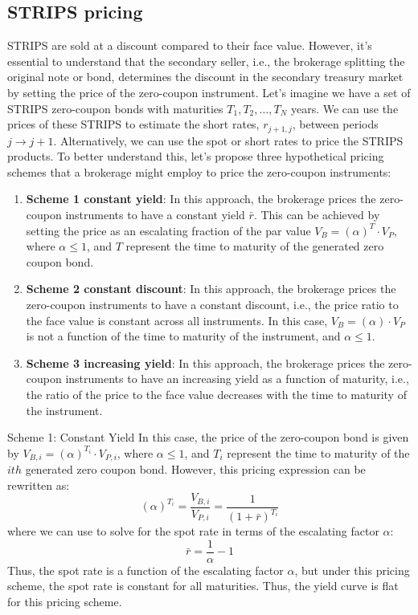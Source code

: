\documentclass[11pt]{article}
\makeatletter
\theoremstyle{definition}
\renewcommand\subsubsection{\@startsection
	{subsubsection}{2}{0mm}
	{-0.05in}
	{-0.5\baselineskip}
	{\normalfont\normalsize\itshape\bfseries}}
\makeatother
\begin{document}
\subsection{STRIPS pricing}
STRIPS are sold at a discount compared to their face value. However, it's essential to understand that the secondary seller, i.e., the brokerage splitting the original note or bond, determines the discount in the secondary treasury market by setting the price of the zero-coupon instrument. Let's imagine we have a set of STRIPS zero-coupon bonds with maturities $T_{1}, T_{2},\ldots, T_{N}$ years. 
We can use the prices of these STRIPS to estimate the short rates, $r_{j+1,j}$, between periods $j\rightarrow{j+1}$.
Alternatively, we can use the spot or short rates to price the STRIPS products. 
To better understand this, let's propose three hypothetical pricing schemes that a brokerage might employ to price the zero-coupon instruments:
\begin{enumerate}
\item{\textbf{Scheme 1 constant yield}: In this approach, the brokerage prices the zero-coupon instruments to have a constant yield $\bar{r}$. This can be achieved by setting the price as an escalating fraction of the par value $V_{B} = \left(\alpha\right)^{T}\cdot{V}_{P}$, where $\alpha\leq{1}$, and $T$ represent the time to maturity of the generated zero coupon bond.}
\item{\textbf{Scheme 2 constant discount}: In this approach, the brokerage prices the zero-coupon instruments to have a constant discount, i.e., the price ratio to the face value is constant across all instruments. In this case, $V_{B} = \left(\alpha\right)\cdot{V}_{P}$ is not a function of the time to maturity of the instrument, and $\alpha\leq{1}$.}
\item{\textbf{Scheme 3 increasing yield}: In this approach, the brokerage prices the zero-coupon instruments to have an increasing yield as a function of maturity, i.e., the ratio of the price to the face value decreases with the time to maturity of the instrument.}
\end{enumerate}

\subsubsection{Scheme 1: Constant Yield}
In this case, the price of the zero-coupon bond is given by $V_{B, i} = \left(\alpha\right)^{T_{i}}\cdot{V}_{P, i}$, where $\alpha\leq{1}$, and $T_{i}$ represent the time to maturity of the $ith$ generated zero coupon bond. However, this pricing expression can be rewritten as:
\begin{equation}
\left(\alpha\right)^{T_{i}} = \frac{V_{B,i}}{V_{P,i}} = \frac{1}{\left(1+\bar{r}\right)^{T_{i}}}
\end{equation}
where we can use to solve for the spot rate in terms of the escalating factor $\alpha$:
\begin{equation}
\bar{r} = \frac{1}{\alpha} - 1
\end{equation}
Thus, the spot rate is a function of the escalating factor $\alpha$, but under this pricing scheme, 
the spot rate is constant for all maturities. Thus, the yield curve is flat for this pricing scheme.
\end{document}
